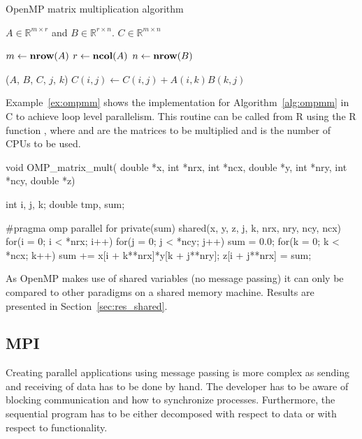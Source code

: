 \begin{algorithm}
\caption{OpenMP matrix multiplication algorithm}
\label{alg:ompmm}
\begin{algorithmic}[1]

  \REQUIRE $A \in \mathbb{R}^{m \times r}$ and $B \in \mathbb{R}^{r
    \times n}$.
  \ENSURE $C \in \mathbb{R}^{m \times n}$

  \STATE $m \leftarrow \textbf{nrow} (A)$
  \STATE $r \leftarrow \textbf{ncol} (A)$
  \STATE $n \leftarrow \textbf{nrow} (B)$

  \STATE \OMPFOR \OMPSHARE($A$, $B$, $C$, $j$, $k$)
         \STATE $C(i,j) \leftarrow C(i,j) + A(i,k)B(k,j)$
       \ENDFOR
    \ENDFOR
  \ENDFOR

\end{algorithmic}
\end{algorithm}

Example~\ref{ex:ompmm} shows the implementation for
Algorithm~\ref{alg:ompmm} in C to achieve loop level parallelism. This
routine can be called from R
using the R function , where  and
 are the matrices to be multiplied and  is the
number of CPUs to be used.

\begin{Example}
\label{ex:ompmm}
\begin{Scode}
void OMP_matrix_mult( double *x, int *nrx, int *ncx,
		      double *y, int *nry, int *ncy,
		      double *z) {
  int i, j, k;
  double tmp, sum;

#pragma omp parallel for private(sum) shared(x, y, z, j, k, nrx, nry, ncy, ncx)
  for(i = 0; i < *nrx; i++)
    for(j = 0; j < *ncy; j++){
      sum = 0.0;
      for(k = 0; k < *ncx; k++) 
	sum += x[i + k**nrx]*y[k + j**nry];
      z[i + j**nrx] = sum;
    }
}
\end{Scode}
\end{Example}

As OpenMP makes use of shared variables (no message passing) it can
only be compared to other paradigms on a shared memory
machine. Results are presented in Section~\ref{sec:res_shared}.

\subsection{MPI}
\label{sec:mmMPI}

Creating parallel applications using message passing is more
complex as sending and receiving of data has to be done by hand. The
developer has to be aware of blocking communication and how to
synchronize processes. Furthermore, the sequential program has to be
either decomposed with respect to data or with respect to
functionality.

